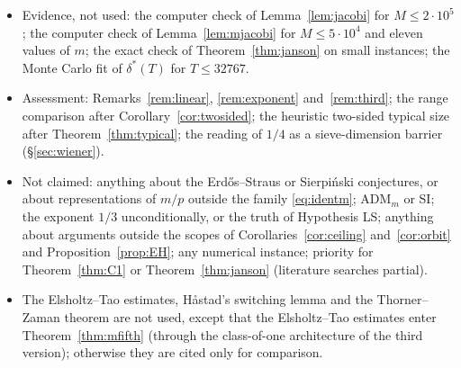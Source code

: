 \documentclass[11pt,reqno]{amsart}
\theoremstyle{definition}
\begin{document}
\begin{itemize}
hypothesis SI is a conjecture.  The numerics for $\mathrm{ADM}_m$ are Evidence.
\item Evidence, not used: the computer check of Lemma~\ref{lem:jacobi} for
$M\le2\cdot10^5$; the computer check of Lemma~\ref{lem:mjacobi} for $M\le5\cdot10^4$ and
eleven values of $m$; the exact check of Theorem~\ref{thm:janson} on small
instances; the Monte Carlo fit of $\delta^*(T)$ for $T\le32767$.
\item Assessment: Remarks~\ref{rem:linear}, \ref{rem:exponent}
and~\ref{rem:third}; the range comparison after Corollary~\ref{cor:twosided}; the heuristic two-sided typical size after
Theorem~\ref{thm:typical}; the reading of $1/4$ as a sieve-dimension barrier
(\S\ref{sec:wiener}).
\item Not claimed: anything about the Erd\H{o}s--Straus or Sierpi\'nski
conjectures, or about representations of $m/p$ outside the family
\eqref{eq:identm}; $\mathrm{ADM}_m$ or SI; the
exponent $1/3$ unconditionally, or the truth of Hypothesis LS; anything about
arguments outside the scopes of Corollaries~\ref{cor:ceiling} and~\ref{cor:orbit}
and Proposition~\ref{prop:EH}; any numerical instance; priority for
Theorem~\ref{thm:C1} or Theorem~\ref{thm:janson} (literature searches
partial).
\item The Elsholtz--Tao estimates, Håstad's switching lemma and the
Thorner--Zaman theorem are not used, except that the Elsholtz--Tao
estimates enter Theorem~\ref{thm:mfifth} (through the class-of-one
architecture of the third version); otherwise they are cited only for
comparison.
\end{itemize}
\end{document}
